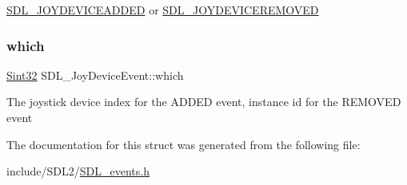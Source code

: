 \hyperlink{_s_d_l__events_8h_a3b589e89be6b35c02e0dd34a55f3fccaa0500c4e830a1822e6d0a90294c3f1393}{S\+D\+L\+\_\+\+J\+O\+Y\+D\+E\+V\+I\+C\+E\+A\+D\+D\+ED} or \hyperlink{_s_d_l__events_8h_a3b589e89be6b35c02e0dd34a55f3fccaa4e2d7a1067dc56abeee393d46309ecd0}{S\+D\+L\+\_\+\+J\+O\+Y\+D\+E\+V\+I\+C\+E\+R\+E\+M\+O\+V\+ED} \mbox{\label{struct_s_d_l___joy_device_event_af9b295798f033b799ebbda7de6cb5a7e}} 
\subsubsection{\texorpdfstring{which}{which}}
{\footnotesize\ttfamily \hyperlink{_s_d_l__stdinc_8h_a7a90b941db9d4582e9ad7abb9940ff7e}{Sint32} S\+D\+L\+\_\+\+Joy\+Device\+Event\+::which}

The joystick device index for the A\+D\+D\+ED event, instance id for the R\+E\+M\+O\+V\+ED event 

The documentation for this struct was generated from the following file\+:\begin{DoxyCompactItemize}
\item 
include/\+S\+D\+L2/\hyperlink{_s_d_l__events_8h}{S\+D\+L\+\_\+events.\+h}\end{DoxyCompactItemize}
